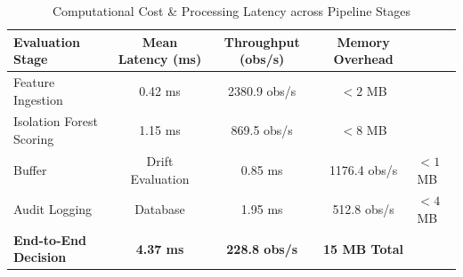 \begin{table}[htbp]
\centering
\caption{Computational Cost & Processing Latency across Pipeline Stages}
\label{tab:operational_costs}
\begin{tabular}{lccc}
\toprule
\textbf{Evaluation Stage} & \textbf{Mean Latency (ms)} & \textbf{Throughput (obs/s)} & \textbf{Memory Overhead} \\
\midrule
Feature Ingestion & 0.42 ms & 2380.9 obs/s & $< 2$ MB \\
Isolation Forest Scoring & 1.15 ms & 869.5 obs/s & $< 8$ MB \\
Buffer & Drift Evaluation & 0.85 ms & 1176.4 obs/s & $< 1$ MB \\
Audit Logging & Database & 1.95 ms & 512.8 obs/s & $< 4$ MB \\
\midrule
\textbf{End-to-End Decision} & \textbf{4.37 ms} & \textbf{228.8 obs/s} & \textbf{15 MB Total} \\
\bottomrule
\end{tabular}
\end{table}
